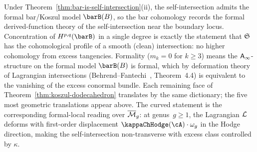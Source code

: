 \begin{remark}[Evidence]
Under Theorem~\ref{thm:bar-is-self-intersection}(ii),
the self-intersection admits the formal bar/Koszul model $\barB(B)$,
so the bar cohomology records the formal derived-function theory of
the self-intersection near the boundary locus. Concentration of
$H^{p,q}(\barB)$ in a single degree is exactly the statement that
$\mathfrak{S}$ has the
cohomological profile of a smooth (clean) intersection: no
higher cohomology from excess tangencies. Formality ($m_k = 0$
for $k \geq 3$) means the $\mathsf{A}_{\infty}$-structure on the formal model
$\barB(B)$
is formal, which by deformation theory of Lagrangian
intersections (Behrend--Fantechi~\cite{BF97}, Theorem~4.4)
is equivalent to the vanishing of the excess conormal bundle.
Each remaining face of
Theorem~\ref{thm:koszul-dodecahedron} translates by the same
dictionary; the five most geometric translations appear above.
The curved statement is the corresponding formal-local reading
over $\overline{\mathcal M}_g$: at genus~$g \geq 1$, the Lagrangian
$\mathcal L$ deforms with first-order displacement $\kappaChHodge(\cA)\cdot
\omega_g$ in the Hodge direction, making the self-intersection
non-transverse with excess class controlled by $\kappa$.
\end{remark}

